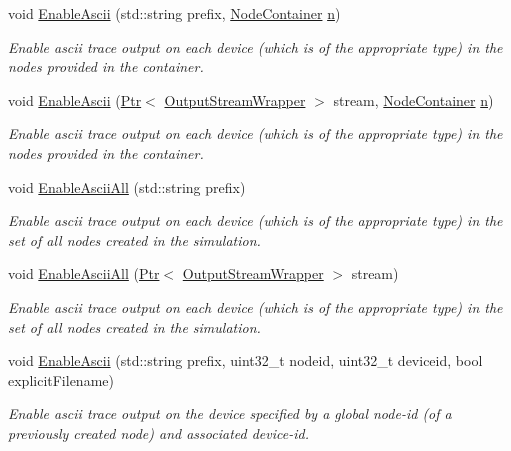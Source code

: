 \begin{DoxyCompactItemize}
void \hyperlink{classns3_1_1AsciiTraceHelperForDevice_aee2f262bd68552c45db70d65ae6d18a9}{Enable\+Ascii} (std\+::string prefix, \hyperlink{classns3_1_1NodeContainer}{Node\+Container} \hyperlink{lte__link__budget__x2__handover__measures_8m_abdb05bc5a064cf642a06c83b3392f148}{n})
\begin{DoxyCompactList}\small\item\em Enable ascii trace output on each device (which is of the appropriate type) in the nodes provided in the container. \end{DoxyCompactList}\item 
void \hyperlink{classns3_1_1AsciiTraceHelperForDevice_a2b271434c49df4eaeda521a4b25c67ba}{Enable\+Ascii} (\hyperlink{classns3_1_1Ptr}{Ptr}$<$ \hyperlink{classns3_1_1OutputStreamWrapper}{Output\+Stream\+Wrapper} $>$ stream, \hyperlink{classns3_1_1NodeContainer}{Node\+Container} \hyperlink{lte__link__budget__x2__handover__measures_8m_abdb05bc5a064cf642a06c83b3392f148}{n})
\begin{DoxyCompactList}\small\item\em Enable ascii trace output on each device (which is of the appropriate type) in the nodes provided in the container. \end{DoxyCompactList}\item 
void \hyperlink{classns3_1_1AsciiTraceHelperForDevice_a63e57c878526c732924e14c1e52cca8b}{Enable\+Ascii\+All} (std\+::string prefix)
\begin{DoxyCompactList}\small\item\em Enable ascii trace output on each device (which is of the appropriate type) in the set of all nodes created in the simulation. \end{DoxyCompactList}\item 
void \hyperlink{classns3_1_1AsciiTraceHelperForDevice_a97fa758a25f1c12b4117cdeab94a1aab}{Enable\+Ascii\+All} (\hyperlink{classns3_1_1Ptr}{Ptr}$<$ \hyperlink{classns3_1_1OutputStreamWrapper}{Output\+Stream\+Wrapper} $>$ stream)
\begin{DoxyCompactList}\small\item\em Enable ascii trace output on each device (which is of the appropriate type) in the set of all nodes created in the simulation. \end{DoxyCompactList}\item 
void \hyperlink{classns3_1_1AsciiTraceHelperForDevice_af74b9046cbe68e22fb19e5480f2566a1}{Enable\+Ascii} (std\+::string prefix, uint32\+\_\+t nodeid, uint32\+\_\+t deviceid, bool explicit\+Filename)
\begin{DoxyCompactList}\small\item\em Enable ascii trace output on the device specified by a global node-\/id (of a previously created node) and associated device-\/id. \end{DoxyCompactList}\item 

\end{DoxyCompactItemize}
